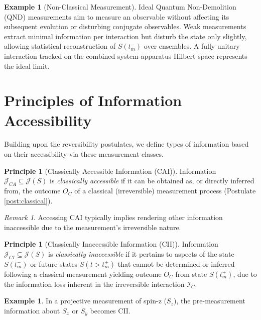 \documentclass[11pt, a4paper]{article}
\theoremstyle{plain} %
\theoremstyle{definition} %
\newtheorem{principle}[theorem]{Principle}
\newtheorem{example}[theorem]{Example}
\theoremstyle{remark} %
\newtheorem{remark}[theorem]{Remark}
\newcommand{\Interaction}{\mathcal{I}} %
\newcommand{\Info}{\mathcal{J}} %
\newcommand{\TimePre}{t_m^-} %
\newcommand{\TimePost}{t_m^+} %
\newcommand{\StatePre}{S(\TimePre)} %
\newcommand{\StatePost}{S(\TimePost)} %
\newcommand{\OutcomeVal}{O} %
\begin{document}
	\begin{example}[Non-Classical Measurement]
		Ideal Quantum Non-Demolition (QND) measurements aim to measure an observable without affecting its subsequent evolution or disturbing conjugate observables. Weak measurements extract minimal information per interaction but disturb the state only slightly, allowing statistical reconstruction of $\StatePre$ over ensembles. A fully unitary interaction tracked on the combined system-apparatus Hilbert space represents the ideal limit.
	\end{example}
	
	
	\section{Principles of Information Accessibility}
	
	Building upon the reversibility postulates, we define types of information based on their accessibility via these measurement classes.
	
	\begin{principle}[Classically Accessible Information (CAI)] \label{princ:CAI}
		Information $\Info_{CA} \subseteq \Info(S)$ is \emph{classically accessible} if it can be obtained as, or directly inferred from, the outcome $\OutcomeVal_C$ of a classical (irreversible) measurement process (Postulate \ref{post:classical}).
	\end{principle}
	\begin{remark}
		Accessing CAI typically implies rendering other information inaccessible due to the measurement's irreversible nature.
	\end{remark}
	
	\begin{principle}[Classically Inaccessible Information (CII)] \label{princ:CII}
		Information $\Info_{CI} \subseteq \Info(S)$ is \emph{classically inaccessible} if it pertains to aspects of the state $\StatePre$ or future states $S(t > \TimePost)$ that cannot be determined or inferred following a classical measurement yielding outcome $\OutcomeVal_C$ from state $\StatePost$, due to the information loss inherent in the irreversible interaction $\Interaction_C$.
	\end{principle}
	\begin{example}
		In a projective measurement of spin-z ($S_z$), the pre-measurement information about $S_x$ or $S_y$ becomes CII.
	\end{example}
	
\end{document}
